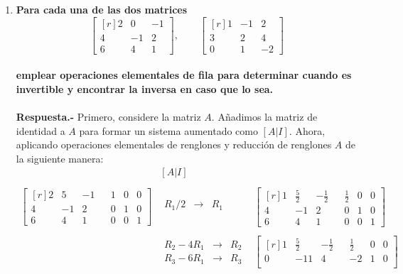 \begin{enumerate}
    \item \textbf{\boldmath Para cada una de las dos matrices 
	$$\begin{bmatrix*}[r]
	    2 & 0 & -1\\
	    4 & -1 & 2\\
	    6 & 4 & 1
	\end{bmatrix*},\qquad 
	\begin{bmatrix*}[r]
	    1 & -1 & 2\\
	    3 & 2 & 4\\
	    0 & 1 & -2
	\end{bmatrix*}$$\\
	emplear operaciones elementales de fila para determinar cuando es invertible y encontrar la inversa en caso que lo sea.\\\\
	Respuesta.-}\; Primero, considere la matriz $A$. Añadimos la matriz de identidad a $A$ para formar un sistema aumentado como $[A|I]$. Ahora, aplicando operaciones elementales de renglones y reducción de renglones $A$ de la siguiente manera:
	$$\begin{array}{rcccc}
	    &[A|I]&\\\\
	    \begin{bmatrix*}[r]
		2 & 5 & -1 && 1 & 0 & 0\\
		4 & -1 & 2 && 0 & 1 & 0\\
		6 & 4 & 1 && 0 & 0 & 1
	    \end{bmatrix*} & 
	    \begin{array}{rcl}
		R_1/2 &\to & R_1\\
	    \end{array}&
	    \begin{bmatrix*}[r]
		1 & \frac{5}{2} & -\frac{1}{2} && \frac{1}{2} & 0 & 0\\
		4 & -1 & 2 && 0 & 1 & 0\\
		6 & 4 & 1 && 0 & 0 & 1
	    \end{bmatrix*}\\\\ 
	    &\begin{array}{rcl}
		R_2-4R_1 &\to & R_2\\
		R_3-6R_1 &\to & R_3
	    \end{array} &
	    \begin{bmatrix*}[r]
		1 & \frac{5}{2} & -\frac{1}{2} && \frac{1}{2} & 0 & 0\\
		0 & -11 & 4 && -2 & 1 & 0\\

\end{bmatrix*}
\end{array}$$
\end{enumerate}
